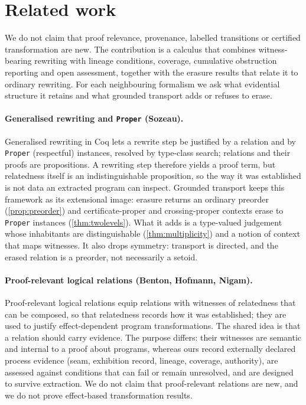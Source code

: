 \section{Related work}\label{sec:related}

We do not claim that proof relevance, provenance, labelled transitions or certified transformation are new. The contribution is a calculus that combines witness-bearing rewriting with lineage conditions, coverage, cumulative obstruction reporting and open assessment, together with the erasure results that relate it to ordinary rewriting. For each neighbouring formalism we ask what evidential structure it retains and what grounded transport adds or refuses to erase.

\paragraph{Generalised rewriting and \texttt{Proper} (Sozeau).}
Generalised rewriting in Coq \cite{sozeau2009} lets a rewrite step be justified by a relation and by \texttt{Proper} (respectful) instances, resolved by type-class search; relations and their proofs are propositions. A rewriting step therefore yields a proof term, but relatedness itself is an indistinguishable proposition, so the way it was established is not data an extracted program can inspect. Grounded transport keeps this framework as its extensional image: erasure returns an ordinary preorder (\cref{prop:preorder}) and certificate-proper and crossing-proper contexts erase to \texttt{Proper} instances (\cref{thm:twolevels}). What it adds is a type-valued judgement whose inhabitants are distinguishable (\cref{thm:multiplicity}) and a notion of context that maps witnesses. It also drops symmetry: transport is directed, and the erased relation is a preorder, not necessarily a setoid.

\paragraph{Proof-relevant logical relations (Benton, Hofmann, Nigam).}
Proof-relevant logical relations \cite{benton2014} equip relations with witnesses of relatedness that can be composed, so that relatedness records how it was established; they are used to justify effect-dependent program transformations. The shared idea is that a relation should carry evidence. The purpose differs: their witnesses are semantic and internal to a proof about programs, whereas ours record externally declared process evidence (seam, exhibition record, lineage, coverage, authority), are assessed against conditions that can fail or remain unresolved, and are designed to survive extraction. We do not claim that proof-relevant relations are new, and we do not prove effect-based transformation results.

